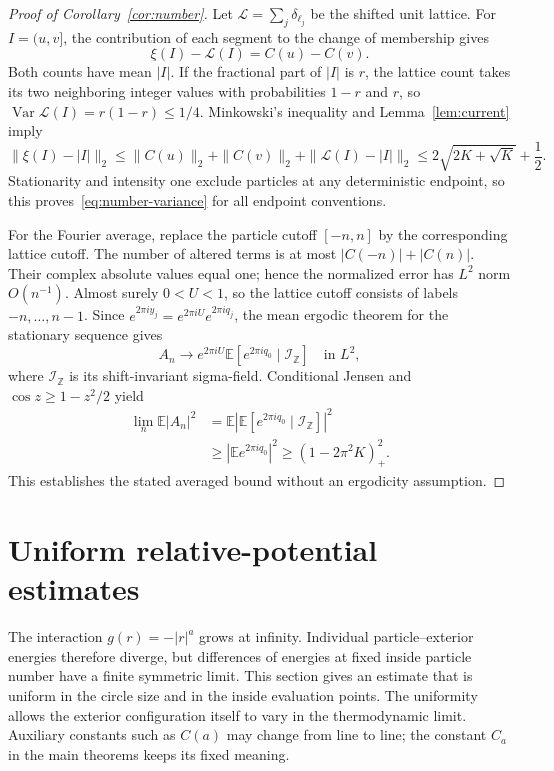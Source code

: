 \documentclass[11pt]{article}
\theoremstyle{remark}\newtheorem{remark}[theorem]{Remark}
\newcommand{\E}{\mathbb E}
\newcommand{\Z}{\mathbb Z}
\newcommand{\Var}{\operatorname{Var}}
\begin{document}
\begin{proof}[Proof of Corollary~\ref{cor:number}]
Let $\mathcal L=\sum_j\delta_{\ell_j}$ be the shifted unit lattice.
For $I=(u,v]$, the contribution of each segment to the change of
membership gives
\begin{equation}\label{eq:interval-current}
 \xi(I)-\mathcal L(I)=C(u)-C(v).
\end{equation}
Both counts have mean $|I|$. If the fractional part of $|I|$ is
$r$, the lattice count takes its two neighboring integer values
with probabilities $1-r$ and $r$, so
$\Var\mathcal L(I)=r(1-r)\le1/4$. Minkowski's inequality and
Lemma~\ref{lem:current} imply
\[
 \|\xi(I)-|I|\|_2
 \le\|C(u)\|_2+\|C(v)\|_2
      +\|\mathcal L(I)-|I|\|_2
 \le2\sqrt{2K+\sqrt K}+\frac12.
\]
Stationarity and intensity one exclude particles at any deterministic
endpoint, so this proves~\eqref{eq:number-variance} for all endpoint
conventions.

For the Fourier average, replace the particle cutoff $[-n,n]$ by
the corresponding lattice cutoff. The number of altered terms is
at most $|C(-n)|+|C(n)|$. Their complex absolute values equal one;
hence the normalized error has $L^2$ norm $O(n^{-1})$. Almost
surely $0<U<1$, so the lattice cutoff consists of labels
$-n,\ldots,n-1$. Since $e^{2\pi iy_j}=e^{2\pi iU}e^{2\pi iq_j}$,
the mean ergodic theorem for the stationary sequence gives
\begin{equation}\label{eq:ergodic-amplitude}
 A_n\longrightarrow
 e^{2\pi iU}\E[e^{2\pi iq_0}\mid\mathcal I_{\Z}]
 \quad\text{in }L^2,
\end{equation}
where $\mathcal I_{\Z}$ is its shift-invariant sigma-field.
Conditional Jensen and $\cos z\ge1-z^2/2$ yield
\begin{align*}
 \lim_n\E|A_n|^2
 &=\E\left|\E[e^{2\pi iq_0}\mid\mathcal I_{\Z}]\right|^2\\
 &\ge\left|\E e^{2\pi iq_0}\right|^2
 \ge(1-2\pi^2K)_+^2.
\end{align*}
This establishes the stated averaged bound without an ergodicity
assumption.
\end{proof}

\section{Uniform relative-potential estimates}\label{sec:potential}

The interaction $g(r)=-|r|^a$ grows at infinity. Individual
particle--exterior energies therefore diverge, but differences of
energies at fixed inside particle number have a finite symmetric
limit. This section gives an estimate that is uniform in the circle
size and in the inside evaluation points. The uniformity allows
the exterior configuration itself to vary in the thermodynamic
limit. Auxiliary constants such as $C(a)$ may change from line to line;
the constant $C_a$ in the main theorems keeps its fixed meaning.
\end{document}
